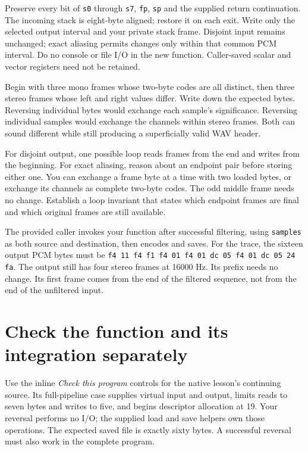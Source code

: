Preserve every bit of \texttt{s0} through \texttt{s7}, \texttt{fp}, \texttt{sp}
and the supplied return continuation. The incoming stack is eight-byte aligned;
restore it on each exit. Write only the selected output interval and your
private stack frame. Disjoint input remains unchanged; exact aliasing permits
changes only within that common PCM interval. Do no console or file I/O in the
new function. Caller-saved scalar and vector registers need not be retained.

Begin with three mono frames whose two-byte codes are all distinct, then three
stereo frames whose left and right values differ. Write down the expected bytes.
Reversing individual bytes would exchange each sample's significance. Reversing
individual samples would exchange the channels within stereo frames. Both can
sound different while still producing a superficially valid WAV header.

For disjoint output, one possible loop reads frames from the end and writes
from the beginning. For exact aliasing, reason about an endpoint pair before
storing either one. You can exchange a frame byte at a time with two loaded
bytes, or exchange its channels as complete two-byte codes. The odd middle
frame needs no change. Establish a loop invariant that states which endpoint
frames are final and which original frames are still available.

The provided caller invokes your function after successful filtering, using
\texttt{samples} as both source and destination, then encodes and saves.
For the trace, the sixteen output PCM bytes must be
\texttt{f4 11 f4 f1 f4 01 f4 01 dc 05 f4 01 dc 05 24 fa}.
The output still has four stereo frames at 16000 Hz. Its prefix needs no change.
Its first frame comes from the end of the filtered sequence, not from the end
of the unfiltered input.

\section{Check the function and its integration separately}

Use the inline \emph{Check this program} controls for the native lesson's
continuing source. Its full-pipeline case supplies virtual input and output,
limits reads to seven bytes and writes to five, and begins descriptor allocation
at 19. Your reversal performs no I/O; the supplied load and save helpers own
those operations. The expected saved file is exactly sixty bytes. A successful
reversal must also work in the complete program.

